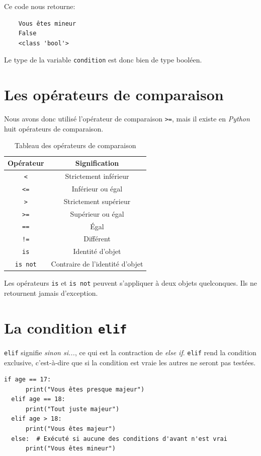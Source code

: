 \documentclass[a4paper,12pt]{book}
\begin{document}
Ce code nous retourne:
\begin{verbatim}
    Vous êtes mineur
    False
    <class 'bool'>
\end{verbatim}
\medskip

Le type de la variable \texttt{condition} est donc bien de type booléen.
\medskip

\section{Les opérateurs de comparaison}
Nous avons donc utilisé l'opérateur de comparaison \texttt{>=}, mais il existe en \textit{Python} huit opérateurs de comparaison.
\begin{table}[h]
\begin{center}
\begin{tabular}{|c|c|}
\hline
\textbf{Opérateur} & \textbf{Signification} \\
\hline
\texttt{<} & Strictement inférieur \\
\hline
\texttt{<=} & Inférieur ou égal \\
\hline
\texttt{>} & Strictement supérieur \\
\hline
\texttt{>=} & Supérieur ou égal \\
\hline
\texttt{==} & Égal \\
\hline
\texttt{!=} & Différent \\
\hline
\texttt{is} & Identité d'objet \\
\hline
\texttt{is not} & Contraire de l'identité d'objet \\
\hline 
\end{tabular}
\caption{Tableau des opérateurs de comparaison}
\end{center}
\end{table}
\medskip

Les opérateurs \texttt{is} et \texttt{is not} peuvent s'appliquer à deux objets quelconques. Ils ne retournent jamais d'exception.
\medskip

\section{La condition \texttt{elif}}
\texttt{elif} signifie \textit{sinon si...}, ce qui est la contraction de \textit{else if}. \texttt{elif} rend la condition exclusive, c'est-à-dire que si la condition est vraie les autres ne seront pas testées.
\begin{lstlisting}[caption=Sinon...si]
  if age == 17:
  	  print("Vous êtes presque majeur")
  elif age == 18:
  	  print("Tout juste majeur")
  elif age > 18:
  	  print("Vous êtes majeur")
  else:  # Exécuté si aucune des conditions d'avant n'est vrai
  	  print("Vous êtes mineur")
\end{lstlisting}
\medskip
\end{document}
